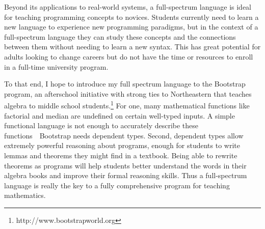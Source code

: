 \documentclass[12pt]{article}
\begin{document}
Beyond its applications to real-world systems, a full-spectrum language is ideal for teaching programming concepts to novices.
Students currently need to learn a new language to experience new programming paradigms, but in the context of a full-spectrum language they can study these concepts and the connections between them without needing to learn a new syntax.
This has great potential for adults looking to change careers but do not have the time or resources to enroll in a full-time university program.

To that end, I hope to introduce my full spectrum language to the Bootstrap program, an afterschool initiative with strong ties to Northeastern that teaches algebra to middle school students.\footnote{http://www.bootstrapworld.org}
For one, many mathematical functions like factorial and median are undefined on certain well-typed inputs.
A simple functional language is not enough to accurately describe these functions~\textemdash~Bootstrap needs dependent types.
Second, dependent types allow extremely powerful reasoning about programs, enough for students to write lemmas and theorems they might find in a textbook.
Being able to rewrite theorems as programs will help students better understand the words in their algebra books and improve their formal reasoning skills.
Thus a full-spectrum language is really the key to a fully comprehensive program for teaching mathematics.

\vspace{-0.2cm}
\renewcommand{\section}[2]{}
\begin{multicols}{2}
\footnotesize


\end{multicols}
\end{document}
